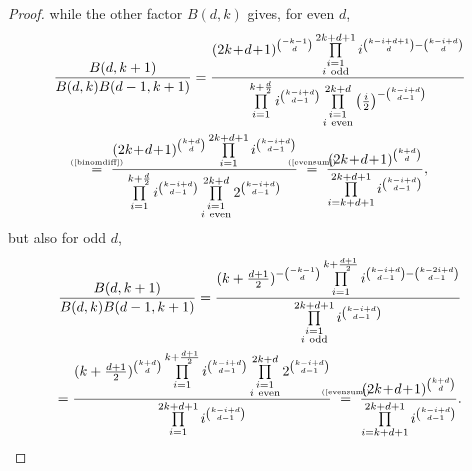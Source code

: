 \documentclass{amsart}
\newcommand{\myeq}[1]{\mathrel{\overset{\makebox[0pt]{\text{\tiny #1}}}{=}}}
\theoremstyle{plain}
\theoremstyle{definition}
\theoremstyle{remark}
\begin{document}
\begin{proof}
while the other factor $B(d,k)$ gives, for even $d$,
\begin{gather*}
\frac{B(d,k+1)}{B(d,k)B(d-1,k+1)} = \frac{ (2k\!+\!d\!+\!1)^{\binom{-k-1}{d}} \prod\limits_{\substack{i=1 \\ i\ \text{odd} }}^{2k+d+1}i^{\binom{k-i+d+1}{d}-\binom{k-i+d}{d}}  }{\prod\limits_{i=1}^{k+\frac{d}{2}} i^{\binom{k-i+d}{d-1}} \prod\limits_{\substack{i=1 \\ i\ \text{even} }}^{2k+d} \left(\frac{i}{2}\right)^{- \binom{k-i+d}{d-1}} } \\
\myeq{(\ref{binomdiff})}\ \frac{ (2k\!+\!d\!+\!1)^{\binom{k+d}{d}}  \prod\limits_{i=1}^{2k+d+1}i^{\binom{k-i+d}{d-1}}  }{ \prod\limits_{i=1}^{k+\frac{d}{2}} i^{\binom{k-i+d}{d-1}} \prod\limits_{\substack{i=1 \\ i\ \text{even} }}^{2k+d} 2^{ \binom{k-i+d}{d-1}} } 
\ \myeq{(\ref{evensum})} \ \frac{ (2k\!+\!d\!+\!1)^{\binom{k+d}{d}} }{ \prod\limits_{i=k+d+1}^{2k+d+1}i^{ \binom{k-i+d}{d-1}} },
\end{gather*}
but also for odd $d$,
\begin{gather*}
\frac{B(d,k+1)}{B(d,k)B(d-1,k+1)} = \frac{ (k+\tfrac{d+1}{2})^{-\binom{-k-1}{d}} \prod\limits_{i=1}^{k+\frac{d+1}{2}} i^{\binom{k-i+d}{d-1}-\binom{k-2i+d}{d-1}}  }{ \prod\limits_{\substack{i=1 \\ i\ \text{odd} }}^{2k+d+1}i^{\binom{k-i+d}{d-1}} } \\
= \frac{ (k+\tfrac{d+1}{2})^{\binom{k+d}{d}} \prod\limits_{i=1}^{k+\frac{d+1}{2}} i^{\binom{k-i+d}{d-1}}  \prod\limits_{\substack{i=1 \\ i\ \text{even} }}^{2k+d} 2^{ \binom{k-i+d}{d-1}}}{ \prod\limits_{i=1}^{2k+d+1}i^{\binom{k-i+d}{d-1}}} 
\ \myeq{(\ref{evensum})} \ \frac{ (2k\!+\!d\!+\!1)^{\binom{k+d}{d}} }{ \prod\limits_{i=k+d+1}^{2k+d+1}i^{ \binom{k-i+d}{d-1}} }.
\end{gather*}\nobreak
\end{proof}
\end{document}
